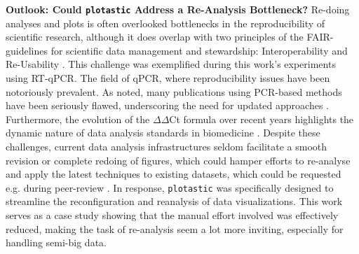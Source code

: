 \textbf{Outlook: Could \texttt{plotastic} Address a Re-Analysis Bottleneck?}
Re-doing analyses and plots is often overlooked bottlenecks in the
reproducibility of scientific research, although it does overlap with two
principles of the FAIR-guidelines for scientific data management and
stewardship: Interoperability and Re-Usability
\cite{wilkinsonFAIRGuidingPrinciples2016}. This challenge was exemplified during
this work's experiments using RT-qPCR. The field of qPCR, where reproducibility
issues have been notoriously prevalent. As
\citet{bustinReproducibilityBiomedicalResearch2014} noted, many publications
using PCR-based methods have been seriously flawed, underscoring the need for
updated approaches \cite{bustinNeedTransparencyGood2013,
    ruiz-villalbaUseMisuseCq2021}. Furthermore, the evolution of the
$\Delta\Delta$Ct formula over recent years highlights the dynamic nature of data
analysis standards in biomedicine \cite{pfafflNewMathematicalModel2001a,
    ramakersAssumptionfreeAnalysisQuantitative2003,
    ruijterEfficiencyCorrectionRequired2021}. Despite these challenges, current data
analysis infrastructures seldom facilitate a smooth revision or complete redoing
of figures, which could hamper efforts to re-analyse and apply the latest
techniques to existing datasets, which could be requested e.g. during
peer-review \cite{wilkinsonFAIRGuidingPrinciples2016}. In response,
\texttt{plotastic} was specifically designed to streamline the reconfiguration
and reanalysis of data visualizations. This work serves as a case study showing
that  the manual effort
involved was effectively reduced, making the task of re-analysis seem a lot more
inviting, especially for handling semi-big data.





